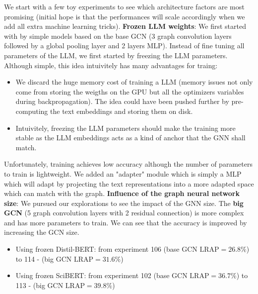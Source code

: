 We start with a few toy experiments to see which architecture factors are most promising (initial hope is that the performances will scale accordingly when we add all extra machine learning tricks).
\textbf{Frozen LLM weights}: We first started with by simple models based on the base GCN (3 graph convolution layers followed by a global pooling layer and 2 layers MLP). Instead of fine tuning all parameters of the LLM, we first started by freezing the LLM parameters. Although simple, this idea intuivitely has many advantages for traing:
\begin{itemize}
    \item We discard the huge memory cost of training a LLM (memory issues not only come from storing the weigths on the GPU but all the optimizers variables during backpropagation). The idea could have been pushed further by pre-computing the text embeddings and storing them on disk. 
    \item Intuivitely, freezing the LLM parameters should make the training more stable as the LLM embeddings acts as a kind of anchor that the GNN shall match.
\end{itemize}
Unfortunately, training achieves low accuracy although the number of parameters to train is lightweight. We added an "adapter" module which is simply a MLP which will adapt by projecting the text representations into a more adapted space which can match with the graph.
\textbf{Influence of the graph neural network size}: We pursued our explorations to see the impact of the GNN size. The \textbf{big GCN} (5 graph convolution layers with 2 residual connection) is more complex and has more parameters to train. We can see that the accuracy is improved by increasing the GCN size. 
\begin{itemize}
    \item Using frozen Distil-BERT: from experiment 106 (base GCN $\text{LRAP}=26.8\%$) to 114 - (big GCN $\text{LRAP}=31.6\%$)
    \item Using frozen SciBERT: from experiment 102 (base GCN $\text{LRAP}=36.7\%$) to 113 - (big GCN $\text{LRAP}=39.8\%$)
\end{itemize}


